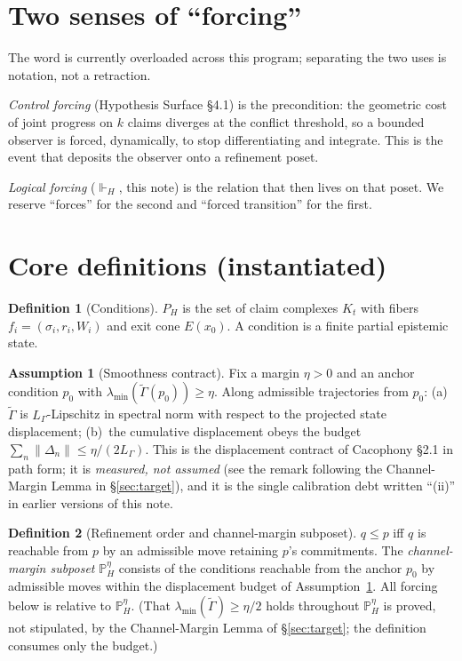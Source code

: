\documentclass[11pt]{article}
\theoremstyle{definition}
\newtheorem{definition}{Definition}
\newtheorem{assumption}{Assumption}
\theoremstyle{remark}
\newcommand{\forcesH}{\Vdash_{H}}
\newcommand{\PHeta}{\mathbb{P}_{H}^{\eta}}
\newcommand{\refines}{\leq}
\newcommand{\Gam}{\tilde{\Gamma}}
\newcommand{\lmin}{\lambda_{\min}}
\newcommand{\Kt}{K_{t}}
\begin{document}
\section{Two senses of ``forcing''}

The word is currently overloaded across this program; separating the two uses is notation, not a
retraction.

\emph{Control forcing} (Hypothesis Surface \S4.1) is the precondition: the geometric cost of
joint progress on $k$ claims diverges at the conflict threshold, so a bounded observer is forced,
dynamically, to stop differentiating and integrate. This is the event that deposits the observer
onto a refinement poset.

\emph{Logical forcing} ($\forcesH$, this note) is the relation that then lives on that poset. We
reserve ``forces'' for the second and ``forced transition'' for the first.

\section{Core definitions (instantiated)}

\begin{definition}[Conditions]\label{def:cond}
$P_H$ is the set of claim complexes $\Kt$ with fibers $f_i=(\sigma_i,r_i,W_i)$ and exit cone
$E(x_0)$. A condition is a finite partial epistemic state.
\end{definition}

\begin{assumption}[Smoothness contract]\label{asm:smooth}
Fix a margin $\eta>0$ and an anchor condition $p_0$ with $\lmin(\Gam(p_0))\ge\eta$. Along
admissible trajectories from $p_0$: (a)~$\Gam$ is $L_\Gamma$-Lipschitz in spectral norm with
respect to the projected state displacement; (b)~the cumulative displacement obeys the budget
$\sum_n\|\Delta_n\|\le\eta/(2L_\Gamma)$. This is the displacement contract of Cacophony \S2.1 in
path form; it is \emph{measured, not assumed} (see the remark following the Channel-Margin Lemma
in \S\ref{sec:target}), and it is the single calibration debt written ``(ii)'' in earlier versions
of this note.
\end{assumption}

\begin{definition}[Refinement order and channel-margin subposet]\label{def:refine}
$q\refines p$ iff $q$ is reachable from $p$ by an admissible move retaining $p$'s commitments. The
\emph{channel-margin subposet} $\PHeta$ consists of the conditions reachable from the anchor $p_0$
by admissible moves within the displacement budget of Assumption~\ref{asm:smooth}. All forcing
below is relative to $\PHeta$. (That $\lmin(\Gam)\ge\eta/2$ holds throughout $\PHeta$ is proved,
not stipulated, by the Channel-Margin Lemma of \S\ref{sec:target}; the definition consumes only the budget.)
\end{definition}
\end{document}
